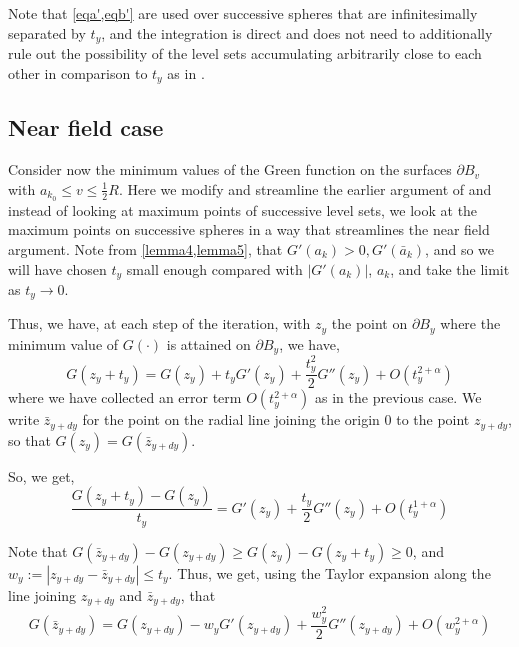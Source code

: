\documentclass{article}
\newcounter{lem}
\theoremstyle{plain}
\theoremstyle{definition}
\theoremstyle{plain}
\begin{document}
Note that \cref{eqa',eqb'} are used over successive spheres that are infinitesimally separated by $t_y$, and the integration is direct and does not need to additionally rule out the possibility of the level sets accumulating arbitrarily close to each other in comparison to $t_y$ as in \cite{Pat25}.

\subsection{Near field case}

Consider now the minimum values of the Green function on the surfaces $\partial B_v$ with $a_{k_0} \le v \le \frac{1}{2} R$. Here we modify and streamline the earlier argument of \cite{Pat25} and instead of looking at maximum points of successive level sets, we look at the maximum points on successive spheres in a way that streamlines the near field argument. Note from \cref{lemma4,lemma5}, that $G'(a_k) > 0,G'(\bar{a}_k) $, and so we will have chosen $t_y$ small enough compared with $|G'(a_k)|$, $a_k$, and take the limit as $t_y \to 0$.

Thus, we have, at each step of the iteration, with $z_y$ the point on $\partial B_y$ where the minimum value of $G(\cdot)$ is attained on $\partial B_y$, we have,
\begin{equation}
G(z_y + t_y) = G(z_y) + t_y G'(z_y) + \frac{t_y^2}{2} G''(z_y) + O(t_y^{2+\alpha})
\end{equation}
where we have collected an error term $O(t_y^{2+\alpha})$ as in the previous case. We write $\bar{z}_{y+dy}$ for the point on the radial line joining the origin $0$ to the point $z_{y+dy}$, so that $G(z_y) = G(\bar{z}_{y+dy})$.

So, we get,
\begin{equation} \label{15}
\frac{G(z_y + t_y) - G(z_y)}{t_y} = G'(z_y) + \frac{t_y}{2} G''(z_y) + O(t_y^{1+\alpha})
\end{equation}

Note that $G(\bar{z}_{y+dy}) - G(z_{y+dy}) \ge G(z_y) - G(z_y + t_y) \ge 0$, and $w_y := |z_{y+dy} - \bar{z}_{y+dy}| \le t_y$. Thus, we get, using the Taylor expansion along the line joining $z_{y+dy}$ and $\bar{z}_{y+dy}$, that
\begin{equation} \label{16}
G(\bar{z}_{y+dy}) = G(z_{y+dy}) - w_y G'(z_{y+dy}) + \frac{w_y^2}{2} G''(z_{y+dy}) + O(w_y^{2+\alpha})
\end{equation}

\end{document}
